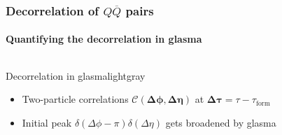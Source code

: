 \documentclass[aspectratio=169,11pt,usenames,dvipsnames]{beamer}
\begin{document}
\begin{frame}
    \frametitle{Decorrelation of $Q\overline{Q}$ pairs}
    \framesubtitle{Quantifying the decorrelation in glasma}
    \vspace{-15pt}
    \begin{center}
        \begin{columns}[onlytextwidth,t]
           \begin{center}
                \begin{custombox2}{\normalsize Decorrelation in glasma}{lightgray}
                    \small
                    \begin{varwidth}{1.02\textwidth}
                    \begin{itemize}\itemsep0em 
                        \itemsep0em
                        \footnotesize
                        \item Two-particle correlations $\boldsymbol{\mathcal{C}(\Delta\phi, \Delta\eta)}$ at $\boldsymbol{\Delta\tau}=\tau-\tau_\mathrm{form}$
                        \item Initial peak $\delta(\Delta\phi-\pi)\delta(\Delta\eta)$ gets broadened by glasma
                    \end{itemize}
                    \end{varwidth}
                \end{custombox2}


\end{center}
\end{columns}
\end{center}
\end{frame}
\end{document}
